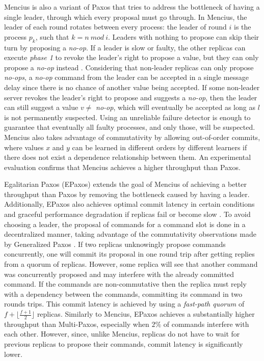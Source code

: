 Mencius is also a variant of Paxos that tries to address the bottleneck of having a single leader, through which every proposal must go through. In Mencius, the leader of each round rotates between every process: the leader of round $i$ is the process $p_k$, such that $k = n\ mod\ i$.  Leaders with nothing to propose can skip their turn by proposing a \textit{no-op}. If a leader is slow or faulty, the other replicas can execute \textit{phase 1} to revoke the leader's right to propose a value, but they can only propose a \textit{no-op} instead \cite{Mao2008}. Considering that non-leader replicas can only propose \textit{no-ops}, a \textit{no-op} command from the leader can be accepted in a single message delay since there is no chance of another value being accepted. If some non-leader server revokes the leader's right to propose and suggests a \textit{no-op}, then the leader can still suggest a value $v \neq$ \textit{no-op}, which will eventually be accepted as long as $l$ is not permanently suspected. Using an unreliable failure detector is enough to guarantee that eventually all faulty processes, and only those, will be suspected. Mencius also takes advantage of commutativity by allowing out-of-order commits, where values $x$ and $y$ can be learned in different orders by different learners if there does not exist a dependence relationship between them. An experimental evaluation confirms that Mencius achieves a higher throughput than Paxos. \par

Egalitarian Paxos (EPaxos) extends the goal of Mencius of achieving a better throughput than Paxos by removing the bottleneck caused by having a leader. Additionally, EPaxos also achieves optimal commit latency in certain conditions and graceful performance degradation if replicas fail or become slow \cite{Moraru2013}. To avoid choosing a leader, the proposal of commands for a command slot is done in a decentralized manner, taking advantage of the commutativity observations made by Generalized Paxos \cite{Lamport2005}. If two replicas unknowingly propose commands concurrently, one will commit its proposal in one round trip after getting replies from a quorum of replicas. However, some replica will see that another command was concurrently proposed and may interfere with the already committed command. If the commands are non-commutative then the replica must reply with a dependency between the commands, committing its command in two rounds trips. This commit latency is achieved by using a \textit{fast-path quorum} of $f+\lfloor\frac{f+1}{2}\rfloor$ replicas. Similarly to Mencius, EPaxos achieves a substantially higher throughput than Multi-Paxos, especially when $2\%$ of commands interfere with each other. However, since, unlike Mencius, replicas do not have to wait for previous replicas to propose their commands, commit latency is significantly lower.

